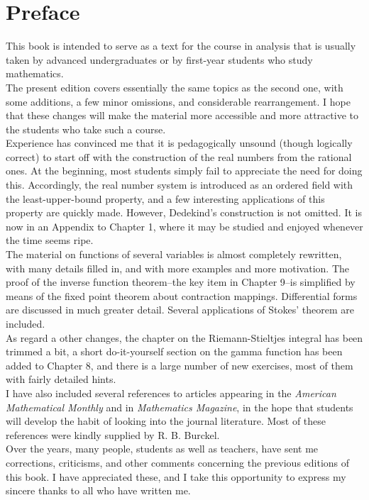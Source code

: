 %

\chapter*{Preface}

\noindent This book is intended to serve as a text for the course in analysis that is usually taken by advanced undergraduates or by 
first-year students who study mathematics.\\
\indent The present edition covers essentially the same topics as the second one, with some additions, a few minor omissions, 
and considerable rearrangement. I hope that these changes will make the material more accessible and more attractive to the 
students who take such a course.\\
\indent Experience has convinced me that it is pedagogically unsound (though logically correct) to start off with the construction 
of the real numbers from the rational ones. At the beginning, most students simply fail to appreciate the need for doing this. 
Accordingly, the real number system is introduced as an ordered field with the least-upper-bound property, and a few interesting 
applications of this property are quickly made. However, Dedekind's construction is not omitted. It is now in an Appendix to Chapter 1, 
where it may be studied and enjoyed whenever the time seems ripe.\\
\indent The material on functions of several variables is almost completely rewritten, with many details filled in, and with 
more examples and more motivation. The proof of the inverse function theorem--the key item in Chapter 9--is simplified by means 
of the fixed point theorem about contraction mappings. Differential forms are discussed in much greater detail. Several applications 
of Stokes' theorem are included.\\
\indent As regard a other changes, the chapter on the Riemann-Stieltjes integral has been trimmed a bit, a short do-it-yourself
section on the gamma function has been added to Chapter 8, and there is a large number of new exercises, most of them with fairly
detailed hints.\\
\indent I have also included several references to articles appearing  in the \emph{American Mathematical Monthly} and in 
\emph{Mathematics Magazine}, in the hope that students will develop the habit of looking into the journal literature. Most of 
these references were kindly supplied by R. B. Burckel.\\
\indent Over the years, many people, students as well as teachers, have sent me corrections, criticisms, and other comments 
concerning the previous editions of this book. I have appreciated these, and I take this opportunity to express my sincere thanks 
to all who have written me.   


